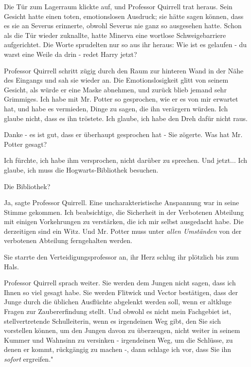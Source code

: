 Die Tür zum Lagerraum klickte auf, und Professor Quirrell trat heraus. Sein
Gesicht hatte einen toten, emotionslosen Ausdruck; sie hätte sagen können, dass
es sie an Severus erinnerte, obwohl Severus nie ganz so ausgesehen hatte. Schon
als die Tür wieder zuknallte, hatte Minerva eine wortlose Schweigebarriere
aufgerichtet. Die Worte sprudelten nur so aus ihr heraus: \glqq{}Wie ist es
gelaufen - du warst eine Weile da drin - redet Harry jetzt?\grqq{}

Professor Quirrell schritt zügig durch den Raum zur hinteren Wand in der Nähe
des Eingangs und sah sie wieder an. Die Emotionslosigkeit glitt von seinem
Gesicht, als würde er eine Maske abnehmen, und zurück blieb jemand sehr
Grimmiges. \glqq{}Ich habe mit Mr. Potter so gesprochen, wie er es von mir
erwartet hat, und habe es vermieden, Dinge zu sagen, die ihn verärgern würden.
Ich glaube nicht, dass es ihn tröstete. Ich glaube, ich habe den Dreh dafür
nicht raus.\grqq{}

\glqq{}Danke - es ist gut, dass er überhaupt gesprochen hat -\grqq{} Sie zögerte.
\glqq{}Was hat Mr. Potter gesagt?\grqq{}

\glqq{}Ich fürchte, ich habe ihm versprochen, nicht darüber zu sprechen. Und
jetzt... Ich glaube, ich muss die Hogwarts-Bibliothek besuchen.\grqq{}

\glqq{}Die Bibliothek?\grqq{}

\glqq{}Ja\grqq{}, sagte Professor Quirrell. Eine uncharakteristische Anspannung
war in seine Stimme gekommen. \glqq{}Ich beabsichtige, die Sicherheit in der
Verbotenen Abteilung mit einigen Vorkehrungen zu verstärken, die ich mir selbst
ausgedacht habe. Die derzeitigen sind ein Witz. Und Mr. Potter muss unter
\emph{allen Umständen} von der verbotenen Abteilung ferngehalten werden.\grqq{}

Sie starrte den Verteidigungsprofessor an, ihr Herz schlug ihr plötzlich bis zum
Hals.

Professor Quirrell sprach weiter. \glqq{}Sie werden dem Jungen nicht sagen, dass
ich Ihnen so viel gesagt habe. Sie werden Flitwick und Vector bestätigen, dass
der Junge durch die üblichen Ausflüchte abgelenkt werden soll, wenn er altkluge
Fragen zur Zaubererfindung stellt. Und obwohl es nicht mein Fachgebiet ist,
stellvertretende Schulleiterin, wenn es irgendeinen Weg gibt, den Sie sich
vorstellen können, um den Jungen davon zu überzeugen, nicht weiter in seinem
Kummer und Wahnsinn zu versinken - irgendeinen Weg, um die Schlüsse, zu denen er
kommt, rückgängig zu machen -, dann schlage ich vor, dass Sie ihn \emph{sofort}
ergreifen."

